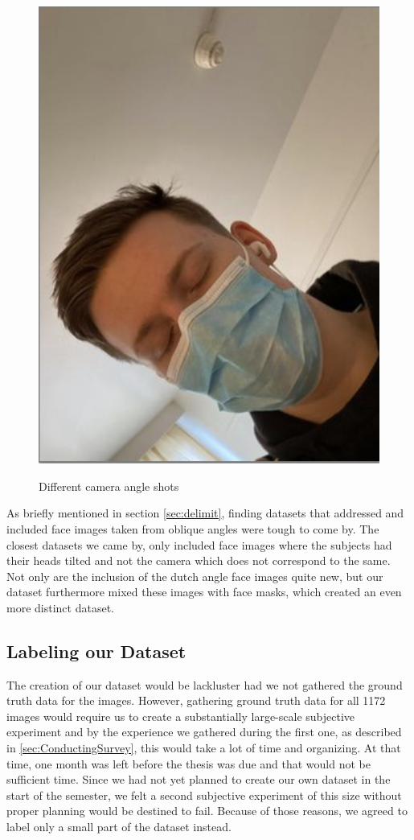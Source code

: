 \begin{figure}[h]
        {\includegraphics[scale = 0.295]{figures/0699.png}}
    \caption{Different camera angle shots}
    \label{fig:tilt}
\end{figure}

As briefly mentioned in section \ref{sec:delimit}, finding datasets that addressed and included face images taken from oblique angles were tough to come by. The closest datasets we came by, only included face images where the subjects had their heads tilted and not the camera which does not correspond to the same. Not only are the inclusion of the dutch angle face images quite new, but our dataset furthermore mixed these images with face masks, which created an even more distinct dataset. 

\subsection*{Labeling our Dataset}
The creation of our dataset would be lackluster had we not gathered the ground truth data for the images. However, gathering ground truth data for all 1172 images would require us to create a substantially large-scale subjective experiment and by the experience we gathered during the first one, as described in \ref{sec:ConductingSurvey}, this would take a lot of time and organizing. At that time, one month was left before the thesis was due and that would not be sufficient time. Since we had not yet planned to create our own dataset in the start of the semester, we felt a second subjective experiment of this size without proper planning would be destined to fail. Because of those reasons, we agreed to label only a small part of the dataset instead.  \newpage

